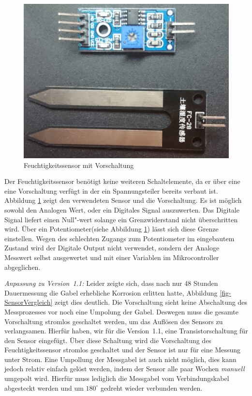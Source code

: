 \begin{figure}[!h]
	\centering
	\includegraphics[width=0.9\linewidth]{bilder/_feuchteSensor1.jpg}
	\caption{Feuchtigkeitssensor mit Vorschaltung}
	\label{fig-SensorVorschaltung}
\end{figure}
Der Feuchtigkeitssensor benötigt keine weiteren Schaltelemente, da er über eine eine Vorschaltung verfügt in der ein Spannungsteiler bereits verbaut ist. 
Abbildung \ref{fig-SensorVorschaltung} zeigt den verwendeten Sensor und die Vorschaltung. 
Es ist möglich sowohl den Analogen Wert, oder ein Digitales Signal auszuwerten. 
Das Digitale Signal liefert einen Null"-wert solange ein Grenzwiderstand nicht überschritten wird. 
Über ein  Potentiometer(siehe Abbildung \ref{fig-SensorVorschaltung}) lässt sich diese Grenze einstellen. 
Wegen des schlechten Zugangs zum Potentiometer im eingebautem Zustand wird der Digitale Output nicht verwendet, sondern der Analoge Messwert selbst ausgewertet und mit einer Variablen im Mikrocontroller abgeglichen.
		
\emph{Anpassung zu Version~1.1:}
Leider zeigte sich, dass nach nur 48 Stunden Dauermessung die Gabel erhebliche Korrosion erlitten hatte, Abbildung \ref{fig-SensorVergleich} zeigt dies deutlich.
Die Vorschaltung sieht keine Abschaltung des Messprozesses vor noch eine Umpolung der Gabel. 
Deswegen muss die gesamte Vorschaltung stromlos geschaltet werden, um das Auflösen des Sensors zu verlangsamen. 
Hierfür haben, wir für die Version~1.1, eine Transistorschaltung für den Sensor eingefügt. 
Über diese Schaltung wird die Vorschaltung des Feuchtigkeitssensor stromlos geschaltet und der Sensor ist nur für eine Messung unter Strom. 
Eine Umpollung der Messgabel ist auch nicht möglich, dies kann jedoch relativ einfach gelöst werden, indem der Sensor alle paar Wochen \emph{manuell} umgepolt wird. 
Hierfür muss lediglich die Messgabel vom Verbindungskabel abgesteckt werden und um \begin{math}180^{\circ}\end{math} gedreht wieder verbunden werden.

